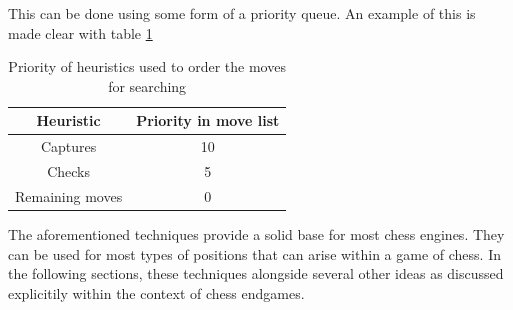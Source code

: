 This can be done using some form of a priority queue. An example of this is made clear with table \ref{tab:heuristicPriorityTable}

\begin{table}[H]
    \centering
    \begin{tabular}{ ||c c|| } 
      \hline
      Heuristic & Priority in move list\\ 
      \hline\hline
      Captures & 10 \\ 
      \hline
      Checks & 5 \\
      \hline
      Remaining moves & 0 \\
      \hline
    \end{tabular}
    \caption{Priority of heuristics used to order the moves for searching}
    \label{tab:heuristicPriorityTable}
\end{table}


The aforementioned techniques provide a solid base for most chess engines. They can be used for most types of positions that can arise within a game of chess. In the following sections, these techniques alongside several other ideas as discussed explicitily within the context of chess endgames.